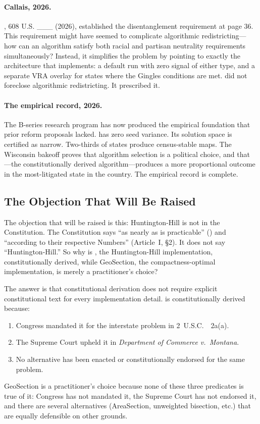 \paragraph{Callais, 2026.}
\callais{}, 608 U.S. \_\_\_ (2026), established the disentanglement
requirement at page 36.
This requirement might have seemed to complicate algorithmic redistricting---
how can an algorithm satisfy both racial and partisan neutrality requirements
simultaneously?
Instead, it simplifies the problem by pointing to exactly the architecture
that \ar{} implements: a default run with zero signal of either type, and
a separate VRA overlay for states where the Gingles conditions are met.
\callais{} did not foreclose algorithmic redistricting.
It prescribed it.

\paragraph{The empirical record, 2026.}
The B-series research program \citep{b0paper,b7paper,b11paper,b13paper,b15paper}
has now produced the empirical foundation that prior reform proposals lacked.
\ar{} has zero seed variance.
Its solution space is certified as narrow.
Two-thirds of states produce census-stable maps.
The Wisconsin bakeoff proves that algorithm selection is a political choice,
and that \ar{}---the constitutionally derived algorithm---produces a more
proportional outcome in the most-litigated state in the country.
The empirical record is complete.

\subsection{The Objection That Will Be Raised}

The objection that will be raised is this: Huntington-Hill is not in the
Constitution.
The Constitution says ``as nearly as is practicable'' (\wesberry{}) and
``according to their respective Numbers'' (Article~I, \S2).
It does not say ``Huntington-Hill.''
So why is \ar{}, the Huntington-Hill implementation, constitutionally derived,
while GeoSection, the compactness-optimal implementation, is merely a
practitioner's choice?

The answer is that constitutional derivation does not require explicit
constitutional text for every implementation detail.
\hh{} is constitutionally derived because:
\begin{enumerate}
  \item Congress mandated it for the interstate problem in 2~U.S.C.~\usca{}~2a(a).
  \item The Supreme Court upheld it in \textit{Department of Commerce
    v.\ Montana}.
  \item No alternative has been enacted or constitutionally endorsed for
    the same problem.
\end{enumerate}
GeoSection is a practitioner's choice because none of these three predicates
is true of it: Congress has not mandated it, the Supreme Court has not
endorsed it, and there are several alternatives (AreaSection, unweighted
bisection, etc.) that are equally defensible on other grounds.

